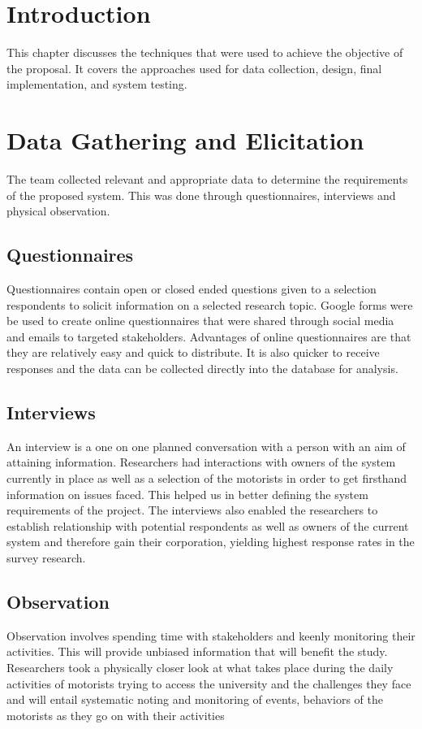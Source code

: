 \section{Introduction}
This chapter discusses the techniques that were used to achieve the objective of the proposal. It covers the approaches used for data collection, design, final implementation, and system testing.


\section{Data Gathering and Elicitation}
The team collected relevant and appropriate data to determine the requirements of the proposed system. This was done through questionnaires, interviews and physical observation\cite{kothari_research_2004}.

\subsection{Questionnaires}
Questionnaires contain open or closed ended questions given to a selection respondents to solicit information on a selected research topic\cite{bartram_using_2019}. Google forms were be used to create online questionnaires that were shared through social media and emails to targeted stakeholders. Advantages of online questionnaires are that they are relatively easy and quick to distribute. It is also quicker to receive responses and the data can be collected directly into the database for analysis.

\subsection{Interviews}
An interview is a one on one planned conversation with a person with an aim of attaining information. Researchers had interactions with owners of the system currently in place as well as a selection of the motorists in order to get firsthand information on issues faced. This helped us in better defining the system requirements of the project. The interviews also enabled the researchers to establish relationship with potential respondents as well as owners of the current system and therefore gain their corporation,  yielding highest response rates in the survey research.

\subsection{Observation}
Observation involves spending time with stakeholders and keenly monitoring their activities. This will provide unbiased information that will benefit the study. Researchers took a physically closer look at what takes place during the daily activities of motorists trying to access the university and the challenges they face and will entail systematic noting and monitoring of events, behaviors of the motorists as they go on with their activities


